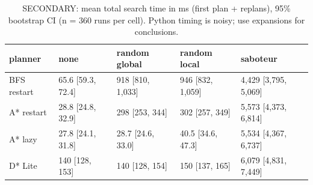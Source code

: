 \begin{table}[t]
\centering
\small
\caption{SECONDARY: mean total search time in ms (first plan + replans), 95\% bootstrap CI (n = 360 runs per cell). Python timing is noisy; use expansions for conclusions.}
\label{tab:time-total}
\begin{tabular}{lllll}
\toprule
planner & none & random global & random local & saboteur \\
\midrule
BFS restart & 65.6 [59.3, 72.4] & 918 [810, 1,033] & 946 [832, 1,059] & 4,429 [3,795, 5,069] \\
A* restart & 28.8 [24.8, 32.9] & 298 [253, 344] & 302 [257, 349] & 5,573 [4,373, 6,814] \\
A* lazy & 27.8 [24.1, 31.8] & 28.7 [24.6, 33.0] & 40.5 [34.6, 47.3] & 5,534 [4,367, 6,737] \\
D* Lite & 140 [128, 153] & 140 [128, 154] & 150 [137, 165] & 6,079 [4,831, 7,449] \\
\bottomrule
\end{tabular}
\end{table}
